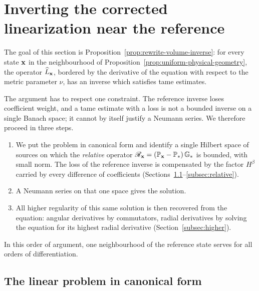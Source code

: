 \section{Inverting the corrected linearization near the reference}
\label{sec:stable-inverse}
\label{sec:grn-fixed-phase-green}

The goal of this section is
Proposition~\ref{prop:rewrite-volume-inverse}: for every state $\mathbf x$
in the neighbourhood of
Proposition~\ref{prop:uniform-physical-geometry}, the operator
$\widehat L_{\mathbf x}$, bordered by the derivative of the equation with
respect to the metric parameter $\nu$, has an inverse which satisfies
tame estimates.

The argument has to respect one constraint. The reference inverse
loses coefficient weight, and a tame estimate with a loss is not a
bounded inverse on a single Banach space; it cannot by itself justify
a Neumann series. We therefore proceed in three steps.
\begin{enumerate}[label=\textup{\arabic*.}]
\item We put the problem in canonical form and identify a single
 Hilbert space of sources on which the \emph{relative} operator
 $\mathscr R_{\mathbf x}=(\mathbb P_{\mathbf x}-\mathbb P_*)\,\mathbb G_*$ is
 bounded, with small norm. The loss of the reference inverse is
 compensated by the factor $H^\beta$ carried by every difference of
 coefficients
 (Sections~\ref{subsec:canonical-problem}--\ref{subsec:relative}).
\item A Neumann series on that one space gives the solution.
\item All higher regularity of this same solution is then recovered
 from the equation: angular derivatives by commutators, radial
 derivatives by solving the equation for its highest radial
 derivative (Section~\ref{subsec:higher}).
\end{enumerate}
In this order of argument, one neighbourhood of the reference state
serves for all orders of differentiation.

\subsection{The linear problem in canonical form}
\label{subsec:canonical-problem}

